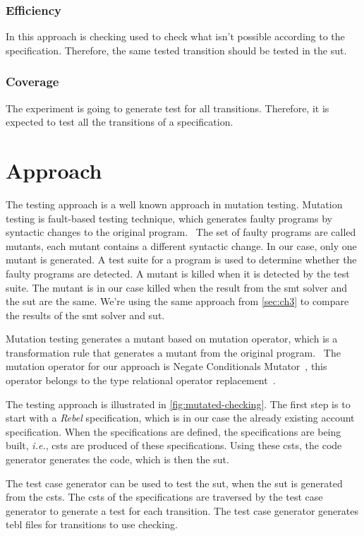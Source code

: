 \subsubsection{Efficiency}
In this approach is checking used to check what isn't possible according to the
specification. Therefore, the same tested transition should be tested in the
\gls{sut}.

\subsubsection{Coverage}
The experiment is going to generate test for all transitions. Therefore,
it is expected to test all the transitions of a specification.

\section{Approach}
The testing approach is a well known approach in mutation testing. Mutation testing is
fault-based testing technique, which generates faulty programs by syntactic
changes to the original program.~\cite[p.~1]{jia2011analysis} The set of faulty
programs are called mutants, each mutant contains a different syntactic change.
In our case, only one mutant is generated. A test suite for a program is used to
determine whether the faulty programs are detected. A mutant is killed when it
is detected by the test suite. The mutant is in our case killed when the result
from the \gls{smt} solver and the \gls{sut} are the same. We're using the same
approach from \autoref{sec:ch3} to compare the results of the \gls{smt} solver and
\gls{sut}.

Mutation testing generates a mutant based on
mutation operator, which is a transformation rule that generates a mutant from
the original program.~\cite[p.~3-4]{jia2011analysis} The mutation operator for
our approach is Negate Conditionals Mutator~\cite{pitmutators}, this operator
belongs to the type relational operator
replacement~\cite[p.~688]{king1991fortran}.

The testing approach is illustrated in \autoref{fig:mutated-checking}. The first
step is to start with a \textit{Rebel} specification, which is in our case the already
existing account specification. When the specifications are defined, the
specifications are being built, \textit{i.e.}, \gls{csts} are
produced of these specifications. Using these \gls{csts}, the code generator generates
the code, which is then the \gls{sut}.

The test case generator can be used to test the \gls{sut}, when the \gls{sut} is generated
from the \gls{csts}. The \gls{csts} of the specifications are traversed by the test case
generator to generate a test for each transition. The test case generator
generates tebl files for transitions to use checking.

